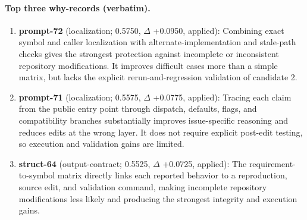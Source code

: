 \paragraph{Top three why-records (verbatim).}\begin{enumerate}\itemsep1pt
\item \textbf{prompt-72} (localization; 0.5750, $\Delta$ +0.0950, applied): Combining exact symbol and caller localization with alternate-implementation and stale-path checks gives the strongest protection against incomplete or inconsistent repository modifications. It improves difficult cases more than a simple matrix, but lacks the explicit rerun-and-regression validation of candidate 2.
\item \textbf{prompt-71} (localization; 0.5575, $\Delta$ +0.0775, applied): Tracing each claim from the public entry point through dispatch, defaults, flags, and compatibility branches substantially improves issue-specific reasoning and reduces edits at the wrong layer. It does not require explicit post-edit testing, so execution and validation gains are limited.
\item \textbf{struct-64} (output-contract; 0.5525, $\Delta$ +0.0725, applied): The requirement-to-symbol matrix directly links each reported behavior to a reproduction, source edit, and validation command, making incomplete repository modifications less likely and producing the strongest integrity and execution gains.
\end{enumerate}
